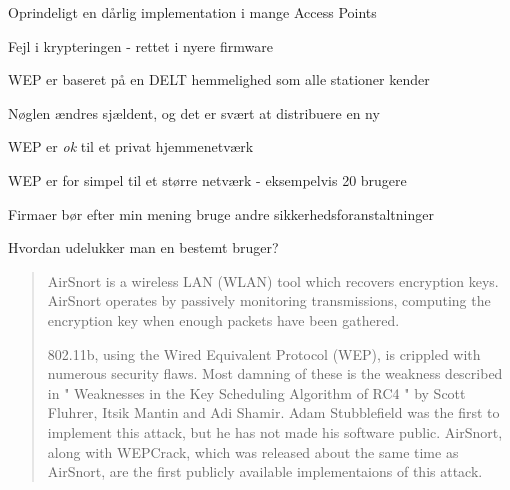 \documentclass[Screen16to9,17pt]{foils}
\begin{document}
\begin{list1}
\item Oprindeligt en dårlig implementation i mange Access Points
\item Fejl i krypteringen - rettet i nyere firmware
\item WEP er baseret på en DELT hemmelighed som alle stationer kender
\item Nøglen ændres sjældent, og det er svært at distribuere en ny
\end{list1}


\begin{list1}
\item WEP er \emph{ok} til et privat hjemmenetværk
\item WEP er for simpel til et større netværk - eksempelvis 20 brugere
\item Firmaer bør efter min mening bruge andre
  sikkerhedsforanstaltninger
\item Hvordan udelukker man en bestemt bruger?
\end{list1}



\begin{quote}
AirSnort is a wireless LAN (WLAN) tool which recovers encryption
keys. AirSnort operates by passively monitoring transmissions,
computing the encryption key when enough packets have been gathered.

802.11b, using the Wired Equivalent Protocol (WEP), is crippled with
numerous security flaws. Most damning of these is the weakness
described in " Weaknesses in the Key Scheduling Algorithm of RC4 "
by Scott Fluhrer, Itsik Mantin and Adi Shamir. Adam Stubblefield
was the first to implement this attack, but he has not made his
software public. AirSnort, along with WEPCrack, which was released
about the same time as AirSnort, are the first publicly available
implementaions of this attack.  
\end{quote}

\end{document}
